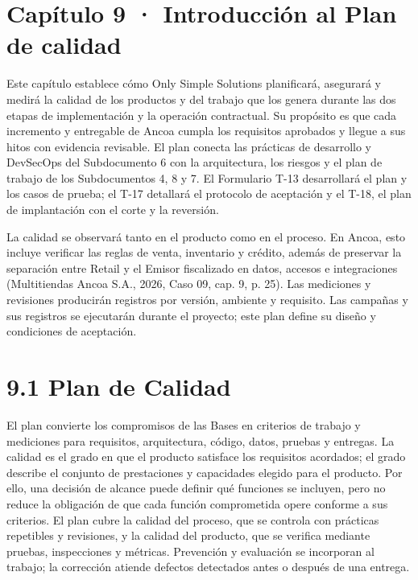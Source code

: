 \documentclass[11pt]{article}
\begin{document}
\renewcommand{\thefigure}{9.\arabic{figure}}

\section{Capítulo 9 · Introducción al Plan de calidad}


Este capítulo establece cómo Only Simple Solutions planificará, asegurará y medirá la calidad de los productos y del trabajo que los genera durante las dos etapas de implementación y la operación contractual. Su propósito es que cada incremento y entregable de Ancoa cumpla los requisitos aprobados y llegue a sus hitos con evidencia revisable. El plan conecta las prácticas de desarrollo y DevSecOps del Subdocumento 6 con la arquitectura, los riesgos y el plan de trabajo de los Subdocumentos 4, 8 y 7. El Formulario T-13 desarrollará el plan y los casos de prueba; el T-17 detallará el protocolo de aceptación y el T-18, el plan de implantación con el corte y la reversión.

La calidad se observará tanto en el producto como en el proceso. En Ancoa, esto incluye verificar las reglas de venta, inventario y crédito, además de preservar la separación entre Retail y el Emisor fiscalizado en datos, accesos e integraciones (Multitiendas Ancoa S.A., 2026, Caso 09, cap. 9, p. 25). Las mediciones y revisiones producirán registros por versión, ambiente y requisito. Las campañas y sus registros se ejecutarán durante el proyecto; este plan define su diseño y condiciones de aceptación.

\section{9.1 Plan de Calidad}

El plan convierte los compromisos de las Bases en criterios de trabajo y mediciones para requisitos, arquitectura, código, datos, pruebas y entregas. La calidad es el grado en que el producto satisface los requisitos acordados; el grado describe el conjunto de prestaciones y capacidades elegido para el producto. Por ello, una decisión de alcance puede definir qué funciones se incluyen, pero no reduce la obligación de que cada función comprometida opere conforme a sus criterios. El plan cubre la calidad del proceso, que se controla con prácticas repetibles y revisiones, y la calidad del producto, que se verifica mediante pruebas, inspecciones y métricas. Prevención y evaluación se incorporan al trabajo; la corrección atiende defectos detectados antes o después de una entrega.
\end{document}
